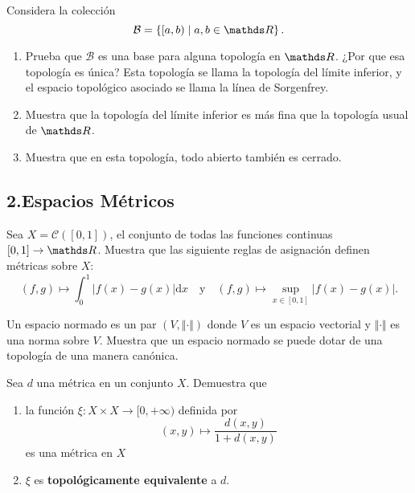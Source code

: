 \documentclass[b5paper,10pt,twoside]{book}
\begin{document}
\begin{problem}
Considera  la colección 
\[
\mathcal{B} = \left\{ 
    [a,b) \mid a,b\in\R
 \right\}.
\]
\begin{enumerate}[label=(\roman*)]
\item Prueba  que \(\mathcal{B}\) es una base para alguna topología en \(\R\). ¿Por que esa topología es única? Esta topología se llama la topología
del límite inferior,
y el espacio topológico asociado se llama 
la línea de Sorgenfrey.


\item Muestra que la  topología
del límite inferior es más fina que la topología usual de \(\R\).

\item Muestra que en esta topología, todo abierto también es cerrado.
\end{enumerate}





\end{problem}

\subsection*{2.\enspace Espacios Métricos}


\begin{problem}
Sea \(X=\mathcal{C}([0,1])\), el conjunto de todas las funciones continuas \([0,1]\to \R\).
Muestra que las
siguiente reglas de asignación 
definen métricas sobre \(X\):
\[
(f,g) \mapsto \int_0^1 |f(x) - g(x)|\mathrm{d}x
\quad\text{y}\quad
(f,g) \mapsto \sup_{x\in[0,1]} |f(x) - g(x)|.
\]

\end{problem}
 

\begin{problem}
Un espacio normado es un par \((V, \Vert \cdot \Vert)\) donde \(V\) es un espacio vectorial y \(\Vert \cdot \Vert\) es una norma sobre \(V\).
Muestra que un espacio normado se puede dotar de una topología de una manera canónica.
\end{problem}


\begin{problem}
Sea $d$ una métrica en un conjunto $X$.
Demuestra que
\begin{enumerate}[label=(\roman*)]
\item la función ${\xi} : X \times X \to [0, +\infty)$ definida por 
\[
(x, y) \mapsto \frac{d(x, y)}{1 + d(x, y)}
\]
es una métrica en $X$

\item \(\xi\) es \textbf{topológicamente equivalente} a \(d\).
\end{enumerate}
\end{problem}
\end{document}
